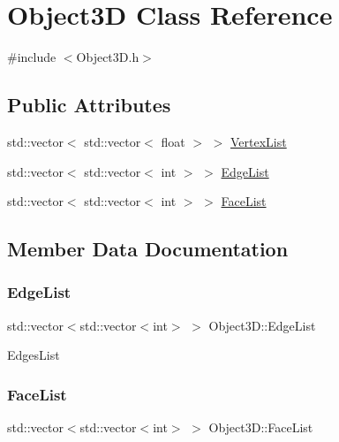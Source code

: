 \hypertarget{class_object3_d}{}\section{Object3D Class Reference}
\label{class_object3_d}


{\ttfamily \#include $<$Object3\+D.\+h$>$}

\subsection*{Public Attributes}
\begin{DoxyCompactItemize}
\item 
std\+::vector$<$ std\+::vector$<$ float $>$ $>$ \mbox{\hyperlink{class_object3_d_a45805c0be9963e17c592e5f5c2b972d7}{Vertex\+List}}
\item 
std\+::vector$<$ std\+::vector$<$ int $>$ $>$ \mbox{\hyperlink{class_object3_d_ae2561ed075132c7731a8918a7b5a4529}{Edge\+List}}
\item 
std\+::vector$<$ std\+::vector$<$ int $>$ $>$ \mbox{\hyperlink{class_object3_d_a740297f2f87984b965a05790e036aed4}{Face\+List}}
\end{DoxyCompactItemize}


\subsection{Member Data Documentation}
\mbox{\label{class_object3_d_ae2561ed075132c7731a8918a7b5a4529}} 
\subsubsection{\texorpdfstring{Edge\+List}{EdgeList}}
{\footnotesize\ttfamily std\+::vector$<$std\+::vector$<$int$>$ $>$ Object3\+D\+::\+Edge\+List}

Edges\+List \mbox{\label{class_object3_d_a740297f2f87984b965a05790e036aed4}} 
\subsubsection{\texorpdfstring{Face\+List}{FaceList}}
{\footnotesize\ttfamily std\+::vector$<$std\+::vector$<$int$>$ $>$ Object3\+D\+::\+Face\+List}

